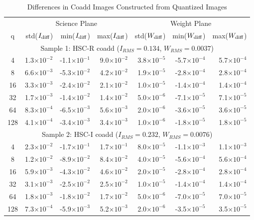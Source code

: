 \begin{table}
\caption{Differences in Coadd Images Constructed from Quantized Images}
\centering
\begin{tabular}[]{c|rrr|rrr}
\hline
          &  \multicolumn{3}{c}{Science Plane} & \multicolumn{3}{c}{Weight Plane} \\
 q        &  std($I_{\rm diff}$) & min($I_{\rm diff}$) & max($I_{\rm diff}$) & std($W_{\rm diff}$) & min($W_{\rm diff}$) & max($W_{\rm diff}$) \\
\hline
\multicolumn{7}{c}{Sample 1: HSC-R coadd ($I_{RMS}=0.134$, $W_{RMS}=0.0037$)}  \\
\hline
  4    &  1.3$\times 10^{-2}$ & -1.1$\times 10^{-1}$ & 9.0$\times 10^{-2}$ &  3.8$\times 10^{-5}$ & -5.7$\times 10^{-4}$ & 5.7$\times 10^{-4}$ \\ 
  8    &  6.6$\times 10^{-3}$ & -5.3$\times 10^{-2}$ & 4.2$\times 10^{-2}$ &  1.9$\times 10^{-5}$ & -2.8$\times 10^{-4}$ & 2.8$\times 10^{-4}$ \\
  16   &  3.3$\times 10^{-3}$ & -2.4$\times 10^{-2}$ & 2.1$\times 10^{-2}$ &  1.0$\times 10^{-5}$ & -1.4$\times 10^{-4}$ & 1.4$\times 10^{-4}$ \\
  32   &  1.7$\times 10^{-3}$ & -1.4$\times 10^{-2}$ & 1.4$\times 10^{-2}$ &  5.0$\times 10^{-6}$ & -7.1$\times 10^{-5}$ & 7.1$\times 10^{-5}$ \\
  64   &  8.3$\times 10^{-4}$ & -6.5$\times 10^{-3}$ & 5.6$\times 10^{-3}$ &  2.0$\times 10^{-6}$ & -3.6$\times 10^{-5}$ & 3.6$\times 10^{-5}$ \\
  128  &  4.1$\times 10^{-4}$ & -3.4$\times 10^{-3}$ & 3.4$\times 10^{-3}$ &  1.0$\times 10^{-6}$ & -1.8$\times 10^{-5}$ & 1.8$\times 10^{-5}$ \\
\hline 
\multicolumn{7}{c}{Sample 2: HSC-I coadd ($I_{RMS}=0.232$, $W_{RMS}=0.0076$)}  \\
\hline
  4    &  2.3$\times 10^{-2}$ & -1.7$\times 10^{-1}$ & 1.7$\times 10^{-1}$ &  8.0$\times 10^{-5}$ & -1.1$\times 10^{-3}$ & 1.1$\times 10^{-3}$ \\
  8    &  1.2$\times 10^{-2}$ & -8.9$\times 10^{-2}$ & 8.4$\times 10^{-2}$ &  4.0$\times 10^{-5}$ & -5.6$\times 10^{-4}$ & 5.6$\times 10^{-4}$ \\
  16   &  5.9$\times 10^{-3}$ & -4.3$\times 10^{-2}$ & 4.6$\times 10^{-2}$ &  2.0$\times 10^{-5}$ & -2.8$\times 10^{-4}$ & 2.8$\times 10^{-4}$ \\
  32   &  3.1$\times 10^{-3}$ & -2.5$\times 10^{-2}$ & 2.5$\times 10^{-2}$ &  1.0$\times 10^{-5}$ & -1.4$\times 10^{-4}$ & 1.4$\times 10^{-4}$ \\
  64   &  1.8$\times 10^{-3}$ & -1.8$\times 10^{-2}$ & 1.7$\times 10^{-2}$ &  5.0$\times 10^{-6}$ & -7.0$\times 10^{-5}$ & 7.0$\times 10^{-5}$ \\
  128  &  7.3$\times 10^{-4}$ & -5.9$\times 10^{-3}$ & 5.2$\times 10^{-3}$ &  2.0$\times 10^{-6}$ & -3.5$\times 10^{-5}$ & 3.5$\times 10^{-5}$ \\
\hline
\end{tabular}
\label{tab_agg_image_stat}
\end{table}


